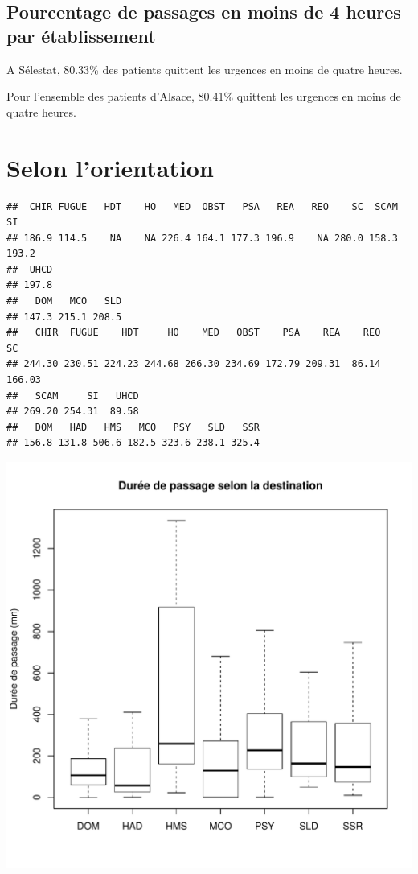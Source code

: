 \documentclass[12pt,english,french,twoside]{report}\usepackage[]{graphicx}\usepackage[]{color}
\makeatletter
\def\maxwidth{ %
  \ifdim\Gin@nat@width>\linewidth
    \linewidth
  \else
    \Gin@nat@width
  \fi
}
\newenvironment{kframe}{%
 \def\at@end@of@kframe{}%
 \ifinner\ifhmode%
  \def\at@end@of@kframe{\end{minipage}}%
  \begin{minipage}{\columnwidth}%
 \fi\fi%
 \def\FrameCommand##1{\hskip\@totalleftmargin \hskip-\fboxsep
 \colorbox{shadecolor}{##1}\hskip-\fboxsep
     \hskip-\linewidth \hskip-\@totalleftmargin \hskip\columnwidth}%
 \MakeFramed {\advance\hsize-\width
   \@totalleftmargin\z@ \linewidth\hsize
   \@setminipage}}%
 {\par\unskip\endMakeFramed%
 \at@end@of@kframe}
\newenvironment{knitrout}{}{} %
\makeatother
\begin{document}
\subsection*{Pourcentage de passages en moins de 4 heures par établissement}




A Sélestat, 80.33\% des patients quittent les urgences en moins de quatre heures.

Pour l'ensemble des patients d'Alsace, 80.41\% quittent les urgences en moins de quatre heures.


\section*{Selon l'orientation}
\begin{knitrout}
\color{fgcolor}\begin{kframe}
\begin{verbatim}
##  CHIR FUGUE   HDT    HO   MED  OBST   PSA   REA   REO    SC  SCAM    SI 
## 186.9 114.5    NA    NA 226.4 164.1 177.3 196.9    NA 280.0 158.3 193.2 
##  UHCD 
## 197.8
##   DOM   MCO   SLD 
## 147.3 215.1 208.5
##   CHIR  FUGUE    HDT     HO    MED   OBST    PSA    REA    REO     SC 
## 244.30 230.51 224.23 244.68 266.30 234.69 172.79 209.31  86.14 166.03 
##   SCAM     SI   UHCD 
## 269.20 254.31  89.58
##   DOM   HAD   HMS   MCO   PSY   SLD   SSR 
## 156.8 131.8 506.6 182.5 323.6 238.1 325.4
\end{verbatim}
\end{kframe}
\includegraphics[width=\maxwidth]{figure/duree_orientation} 

\end{knitrout}
\end{document}
